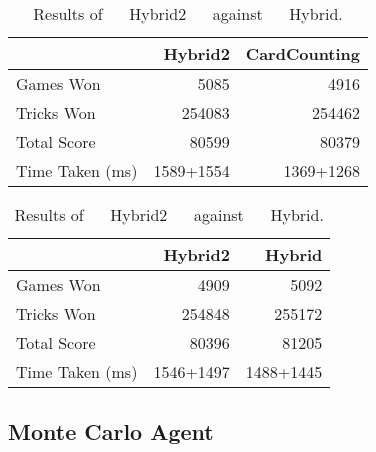 \begin{table}[ht]
    \begin{minipage}{.525\linewidth}
        \centering
        \begin{tabular}{l|rr}
            ~               &  Hybrid2 &   CardCounting  \\  \hline
            Games Won       &   5085        &   4916   \\
            Tricks Won      &   254083      &   254462 \\
            Total Score     &   80599      &   80379  \\
            Time Taken (ms) &   1589+1554   &   1369+1268
        \end{tabular}
        \caption{Results of Hybrid2 against CardCounting.}
        \label{tab:hybrid2_cardcounting}
    \end{minipage}%
    \begin{minipage}{.525\linewidth}
        \centering
        \begin{tabular}{l|rr}
            ~               &  Hybrid2 &   Hybrid  \\  \hline
            Games Won       &   4909        &   5092   \\
            Tricks Won      &   254848      &   255172 \\
            Total Score     &   80396      &   81205  \\
            Time Taken (ms) &   1546+1497   &   1488+1445
        \end{tabular}
        \caption{Results of ~~ Hybrid2 ~~ against ~~ Hybrid.}
        \label{tab:hybrid2_hybrid}
    \end{minipage} 
\end{table}



\subsection{Monte Carlo Agent}

